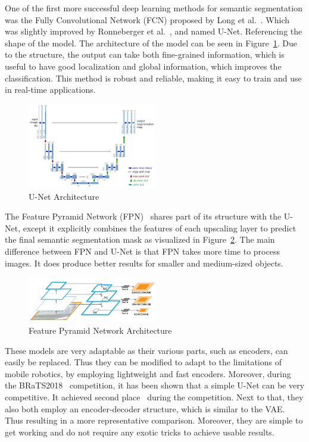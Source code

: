 One of the first more successful deep learning methods for semantic segmentation was the Fully Convolutional Network (FCN) proposed by Long et al.~\cite{long2015fully}. Which was slightly improved by Ronneberger et al.~\cite{ronneberger2015u}, and named U-Net. Referencing the shape of the model. The architecture of the model can be seen in Figure~\ref{fig:unet-architecture}. Due to the structure, the output can take both fine-grained information, which is useful to have good localization and global information, which improves the classification. This method is robust and reliable, making it easy to train and use in real-time applications.
\begin{figure}[ht]
    \centering
    \includegraphics[width=0.5\textwidth]{figures/unet-architecture.png}
    \caption{U-Net Architecture~\cite{ronneberger2015u}}
    \label{fig:unet-architecture}
\end{figure}

The Feature Pyramid Network (FPN)~\cite{lin2017feature} shares part of its structure with the U-Net, except it explicitly combines the features of each upscaling layer to predict the final semantic segmentation mask as visualized in Figure~\ref{fig:fpn-architecture}. The main difference between FPN and U-Net is that FPN takes more time to process images. It does produce better results for smaller and medium-sized objects.

\begin{figure}[ht]
    \centering
    \includegraphics[width=0.5\textwidth]{figures/fpn-architecture.png}
    \caption{Feature Pyramid Network Architecture~\cite{lin2017feature}}
    \label{fig:fpn-architecture}
\end{figure}

These models are very adaptable as their various parts, such as encoders, can easily be replaced. Thus they can be modified to adapt to the limitations of mobile robotics, by employing lightweight and fast encoders. Moreover, during the BRaTS2018~\cite{menze2014multimodal} competition, it has been shown that a simple U-Net can be very competitive. It achieved second place~\cite{DBLP:journals/corr/abs-1809-10483} during the competition. Next to that, they also both employ an encoder-decoder structure, which is similar to the VAE. Thus resulting in a more representative comparison. Moreover, they are simple to get working and do not require any exotic tricks to achieve usable results.
